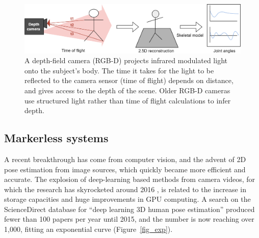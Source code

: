 \begin{figure}[hbtp]
	\centering
	\def\svgwidth{1\columnwidth}
	\fontsize{10pt}{10pt}\selectfont
	\includegraphics[width=\linewidth]{"../Chap1/Figures/Depth.png"}
	\caption{A depth-field camera (RGB-D) projects infrared modulated light onto the subject's body. The time it takes for the light to be reflected to the camera sensor (time of flight) depends on distance, and gives access to the depth of the scene.	Older RGB-D cameras use structured light rather than time of flight calculations to infer depth.}
	\label{fig_depth}
\end{figure}

\FloatBarrier
\subsection{Markerless systems}

A recent breakthrough has come from computer vision, and the advent of 2D pose estimation from image sources, which quickly became more efficient and accurate. The explosion of deep-learning based methods from camera videos, for which the research has skyrocketed around 2016 \cite{Wang2021a}, is related to the increase in storage capacities and huge improvements in GPU computing. A search on the ScienceDirect database for “deep learning 3D human pose estimation” produced fewer than 100 papers per year until 2015, and the number is now reaching over 1,000, fitting an exponential curve (Figure~\ref{fig_exp}).






